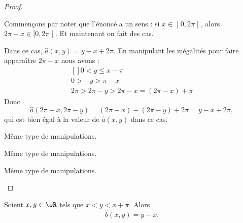 \begin{proof}
\begin{subproof}
		Commençons par noter que l'énoncé a un sens : si \( x\in\mathopen] 0,2\pi\mathclose[\), alors \( 2\pi-x\in\mathopen[ 0,2\pi\mathclose[\). Et maintenant on fait des cas.
		\begin{subproof}
			\spitem[Si \( 0<y\leq x-\pi\)]
			Dans ce cas, \( \hat a(x,y)=y-x+2\pi\). En manipulant les inégalités pour faire apparaître \( 2\pi-x\) nous avons :
			\begin{equation}
				\begin{aligned}[]
					0<y\leq x-\pi \\
					0>-y>\pi-x    \\
					2\pi>2\pi-y>2\pi-x=(2\pi-x)+\pi
				\end{aligned}
			\end{equation}
			Donc
			\begin{equation}
				\hat a(2\pi-x,2\pi-y)=(2\pi-x)-(2\pi-y)+2\pi=y-x+2\pi,
			\end{equation}
			qui est bien égal à la valeur de \( \hat a(x,y)\) dans ce cas.

			\spitem[Si\( x-\pi<y<x\)]
			Même type de manipulations.

			\spitem[Si \( x<y<x+\pi\)]
			Même type de manipulations.

			\spitem[Si \( x+\pi\leq y<2\pi\)]
			Même type de manipulations.
		\end{subproof}
	\end{subproof}
\end{proof}


\begin{proposition}	\label{PROPooCRHHooUHiIxr}
	Soient \( x,y\in \eR\) tels que \( x<y<x+\pi\). Alors
	\begin{equation}
		\hat b(x,y)=y-x.
	\end{equation}
\end{proposition}

